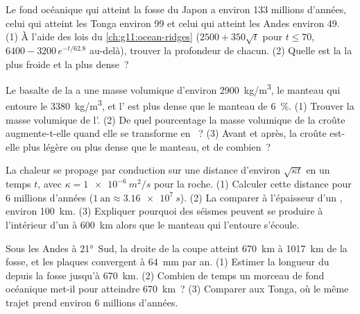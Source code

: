 \begin{exercise}[$\star\star$]\label{exo:g11:subduction-zones:10}
Le fond océanique qui atteint la fosse du Japon a environ 133 millions
d'années, celui qui atteint les Tonga environ 99 et celui qui atteint les
Andes environ 49. (1) À l'aide des lois du \cref{ch:g11:ocean-ridges}
($2500 + 350\sqrt{t}$ pour
$t \le 70$, $6400 - 3200\,e^{-t/62.8}$ au-delà), trouver la profondeur de
chacun. (2) Quelle est la  la plus froide et la plus dense~?
\end{exercise}

\begin{exercise}[$\star\star$]\label{exo:g11:subduction-zones:11}
Le basalte de la  a une masse volumique d'environ
\qty{2900}{kg/m^3}, le manteau qui entoure le 
\qty{3380}{kg/m^3}, et l' est plus dense que le manteau de
\qty{6}{\percent}. (1) Trouver la masse volumique de l'. (2) De quel
pourcentage la masse volumique de la croûte augmente-t-elle quand elle se
transforme en ~? (3) Avant et après, la croûte est-elle plus légère
ou plus dense que le manteau, et de combien~?
\end{exercise}

\begin{exercise}[$\star\star\star$]\label{exo:g11:subduction-zones:12}
La chaleur se propage par conduction sur une distance d'environ
$\sqrt{\kappa t}$ en un temps $t$, avec $\kappa = \qty{1e-6}{m^2/s}$ pour
la roche. (1) Calculer cette distance pour 6 millions d'années
($1~\text{an} \approx \qty{3.16e7}{s}$). (2) La comparer à l'épaisseur d'un
, environ \qty{100}{km}. (3) Expliquer pourquoi des séismes
peuvent se produire à l'intérieur d'un  à \qty{600}{km}
alors que le manteau qui l'entoure s'écoule.
\end{exercise}

\begin{exercise}[$\star\star\star$]\label{exo:g11:subduction-zones:13}
Sous les Andes à \ang{21}~Sud, la droite de la coupe atteint
\qty{670}{km} à \qty{1017}{km} de la fosse, et les plaques convergent à
\qty{64}{mm} par an. (1) Estimer la longueur du  depuis la
fosse jusqu'à \qty{670}{km}. (2) Combien de temps un morceau de fond
océanique met-il pour atteindre \qty{670}{km}~? (3) Comparer aux Tonga, où
le même trajet prend environ 6 millions d'années.
\end{exercise}

